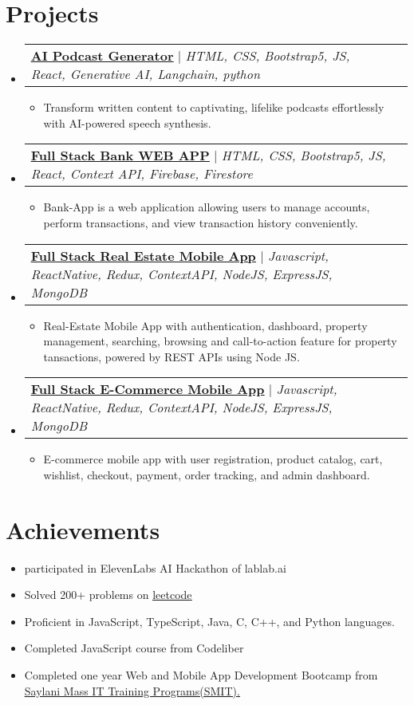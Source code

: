 \documentclass[letterpaper,11pt]{article}
\makeatletter
\newcommand{\resumeItem}[1]{
  \item\small{
    {#1 \vspace{-2pt}}
  }
}
\newcommand{\resumeProjectHeading}[2]{
    \item
    \begin{tabular*}{0.97\textwidth}{l@{\extracolsep{\fill}}r}
      \small#1 & #2 \\
    \end{tabular*}\vspace{-7pt}
}
\newcommand{\resumeSubHeadingListStart}{\begin{itemize}[leftmargin=0.15in, label={}]}
\newcommand{\resumeSubHeadingListEnd}{\end{itemize}}
\newcommand{\resumeItemListStart}{\begin{itemize}}
\newcommand{\resumeItemListEnd}{\end{itemize}\vspace{-5pt}}
\makeatother
\begin{document}
\section{Projects}
    \resumeSubHeadingListStart
      \resumeProjectHeading
          {\textbf{\href{https://github.com/Louvivien/AIpodcastgenerator}{\underline{AI Podcast Generator}}} $|$ \emph{HTML, CSS, Bootstrap5, JS, React, Generative AI, Langchain, python}}{}
          \resumeItemListStart
            \resumeItem{Transform written content to captivating, lifelike podcasts effortlessly with AI-powered speech synthesis.}
          \resumeItemListEnd
      \resumeProjectHeading
          {\textbf{\href{https://github.com/Ahmadjajja/React_Bank}{\underline{Full Stack Bank WEB APP}}} $|$ \emph{HTML, CSS, Bootstrap5, JS, React, Context API, Firebase, Firestore}}{}
          \resumeItemListStart
            \resumeItem{Bank-App is a web application allowing users to manage accounts, perform
            transactions, and view transaction history conveniently.}
          \resumeItemListEnd
      \resumeProjectHeading
          {\textbf{\href{https://github.com/Ahmadjajja/Social_Real_Estate_System_Mobile_App_Frontend}{\underline{Full Stack Real Estate Mobile App}}} $|$ \emph{Javascript, ReactNative, Redux, ContextAPI, NodeJS,
          ExpressJS, MongoDB}}{}
          \resumeItemListStart
            \resumeItem{Real-Estate Mobile App with authentication, dashboard, property
            management, searching, browsing and call-to-action feature for property
            tansactions, powered by REST APIs using Node JS.}
          \resumeItemListEnd
      \resumeProjectHeading
          {\textbf{\href{https://github.com/Ahmadjajja/E_Commerce_Mobile_App_Frontend}{\underline{Full Stack E-Commerce Mobile App}}} $|$ \emph{Javascript, ReactNative, Redux, ContextAPI, NodeJS,
          ExpressJS, MongoDB}}{}
          \resumeItemListStart
            \resumeItem{E-commerce mobile app with user registration, product catalog, cart, wishlist,
            checkout, payment, order tracking, and admin dashboard.}
          \resumeItemListEnd
    \resumeSubHeadingListEnd

\section{Achievements}
          \resumeItemListStart
            \resumeItem{participated in ElevenLabs AI Hackathon of lablab.ai}
            \resumeItem{Solved 200+ problems on {\href{https://leetcode.com/ahmadjajja86/}{\underline{leetcode}}}}
            \resumeItem{Proficient in JavaScript, TypeScript, Java, C, C++, and Python languages.}
            \resumeItem{Completed JavaScript course from Codeliber}
            \resumeItem{Completed one year Web and Mobile App Development Bootcamp from
            {\href{https://drive.google.com/file/d/1HAMbxoTU0kpSDj8k-YFjYE14ngWeisZ1/view}{\underline{Saylani Mass IT Training Programs(SMIT).}}}}
          \resumeItemListEnd



\end{document}
